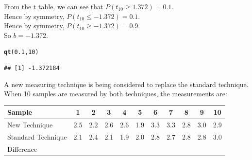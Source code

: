 \documentclass[bigtut]{tutorial}\usepackage[]{graphicx}\usepackage[]{color}
\makeatletter
\newcommand{\hlnum}[1]{\textcolor[rgb]{0.686,0.059,0.569}{#1}}%
\newcommand{\hlstd}[1]{\textcolor[rgb]{0.345,0.345,0.345}{#1}}%
\newcommand{\hlkwd}[1]{\textcolor[rgb]{0.737,0.353,0.396}{\textbf{#1}}}%
\newenvironment{kframe}{%
 \def\at@end@of@kframe{}%
 \ifinner\ifhmode%
  \def\at@end@of@kframe{\end{minipage}}%
  \begin{minipage}{\columnwidth}%
 \fi\fi%
 \def\FrameCommand##1{\hskip\@totalleftmargin \hskip-\fboxsep
 \colorbox{shadecolor}{##1}\hskip-\fboxsep
     \hskip-\linewidth \hskip-\@totalleftmargin \hskip\columnwidth}%
 \MakeFramed {\advance\hsize-\width
   \@totalleftmargin\z@ \linewidth\hsize
   \@setminipage}}%
 {\par\unskip\endMakeFramed%
 \at@end@of@kframe}
\newenvironment{knitrout}{}{} %
\makeatother
\begin{document}
\begin{tutorial}
\begin{questions}
\begin{solution}
From the t table, we can see that $P(t_{10} \geq 1.372) = 0.1$. \\
Hence by symmetry,  $P(t_{10} \leq -1.372) = 0.1$. \\
Hence by symmetry,  $P(t_{10} \geq -1.372) = 0.9$. \\
So $b=-1.372$. \\

\begin{knitrout}
\color{fgcolor}\begin{kframe}
\begin{alltt}
\hlkwd{qt}\hlstd{(}\hlnum{0.1}\hlstd{,}\hlnum{10}\hlstd{)}
\end{alltt}
\begin{verbatim}
## [1] -1.372184
\end{verbatim}
\end{kframe}
\end{knitrout}

\end{solution}

\question 

A new measuring technique is being considered to replace the standard technique. When 10 samples are measured by both techniques, the measurements are: \\
\begin{center}
\begin{tabular}{|l|cccccccccc|}\hline
 Sample &1&2&3&4&5&6&7&8&9&10\\ \hline
New Technique     &2.5 &2.2 &2.6 &2.6 &1.9 &3.3 &3.3 &2.8 &3.0 &2.9\\
Standard Technique &2.1 &2.4 &2.1 &1.9 &2.0 &2.8 &2.7 &2.8 &2.8 &3.0\\ \hline
Difference & & & & & & & & & & \\ \hline
\end{tabular}
 \end{center}

\end{questions}
\end{tutorial}
\end{document}
